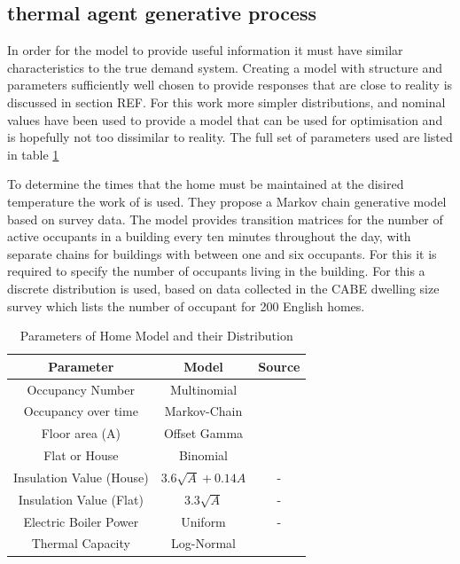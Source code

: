 \documentclass[a4paper, 10 pt, conference]{ieeeconf}  %
\begin{document}
\subsection{thermal agent generative process}
In order for the model to provide useful information it must have similar characteristics to the true demand system. Creating a model with structure and parameters sufficiently well chosen to provide responses that are close to reality is discussed in section REF. For this work more simpler distributions, and nominal values have been used to provide a model that can be used for optimisation and is hopefully not too dissimilar to reality. The full set of parameters used are listed in table \ref{modelpara}

To determine the times that the home must be maintained at the disired temperature the work of \cite{richardson2008high} is used. They propose a Markov chain generative model based on survey data. The model provides transition matrices for the number of active occupants in a building every ten minutes throughout the day, with separate chains for buildings with between one and six occupants. For this it is required to specify the number of occupants living in the building. For this a discrete distribution is used, based on data collected in the CABE dwelling size survey \cite{CABE} which lists the number of occupant for 200 English homes.

\begin{table}[h]
\caption{Parameters of Home Model and their Distribution}
\label{modelpara}
\begin{center}
\begin{tabular}{|c||c|c|}
\hline
Parameter & Model&Source\\
\hline \hline
Occupancy Number & Multinomial & \cite{CABE}\\
\hline
Occupancy over time & Markov-Chain & \cite{richardson2008high}\\
\hline
Floor area (A) & Offset Gamma & \cite{CABE}\\
\hline
Flat or House & Binomial & \cite{CABE}\\
\hline
Insulation Value (House) & $3.6\sqrt{A}+0.14A$&-\\
\hline
Insulation Value (Flat) & $3.3\sqrt{A}$&-\\
\hline
Electric Boiler Power & Uniform&-\\
\hline
Thermal Capacity & Log-Normal & \cite{SAP}\\
\hline
\end{tabular}
\end{center}
\end{table}
\end{document}

